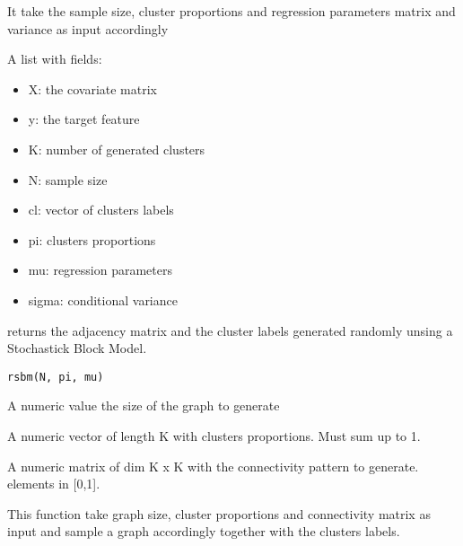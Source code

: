\documentclass[letterpaper]{book}
\begin{document}
%
\begin{Details}\relax
It take the sample size, cluster proportions and regression parameters matrix and variance  as input accordingly
\end{Details}
%
\begin{Value}
A list with fields:
\begin{itemize}

\item X: the covariate matrix 
\item y: the target feature
\item K: number of generated clusters
\item N: sample size
\item cl: vector of clusters labels
\item pi: clusters proportions
\item mu: regression parameters
\item sigma: conditional variance

\end{itemize}

\end{Value}
%
\begin{Description}\relax
{} returns the adjacency matrix and the cluster labels generated randomly unsing a Stochastick Block Model.
\end{Description}
%
\begin{Usage}
\begin{verbatim}
rsbm(N, pi, mu)
\end{verbatim}
\end{Usage}
%
\begin{Arguments}
\begin{ldescription}
\item[\code{N}] A numeric value the size of the graph to generate

\item[\code{pi}] A numeric vector of length K with clusters proportions. Must sum up to 1.

\item[\code{mu}] A numeric matrix of dim K x K with the connectivity pattern to generate. elements in [0,1].
\end{ldescription}
\end{Arguments}
%
\begin{Details}\relax
This function take graph size, cluster proportions and connectivity matrix as input and sample a graph accordingly together with the clusters labels.
\end{Details}
\end{document}
